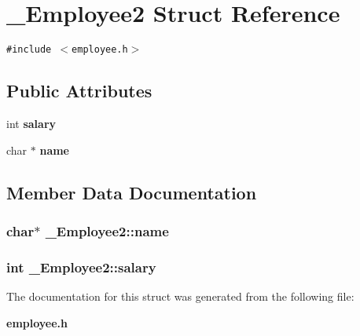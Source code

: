 \section{\_\-Employee2 Struct Reference}
\label{struct__Employee2}
{\tt \#include $<$employee.h$>$}

\subsection*{Public Attributes}
\begin{CompactItemize}
\item 
int \bf{salary}
\item 
char $\ast$ \bf{name}
\end{CompactItemize}


\subsection{Member Data Documentation}
\subsubsection{\setlength{\rightskip}{0pt plus 5cm}char$\ast$ \bf{\_\-Employee2::name}}\label{struct__Employee2_ee8701ef870506233cd25e98fdeccd68}


\subsubsection{\setlength{\rightskip}{0pt plus 5cm}int \bf{\_\-Employee2::salary}}\label{struct__Employee2_0022bb6b124c53dcb98f2ed728b32d12}




The documentation for this struct was generated from the following file:\begin{CompactItemize}
\item 
\bf{employee.h}\end{CompactItemize}
